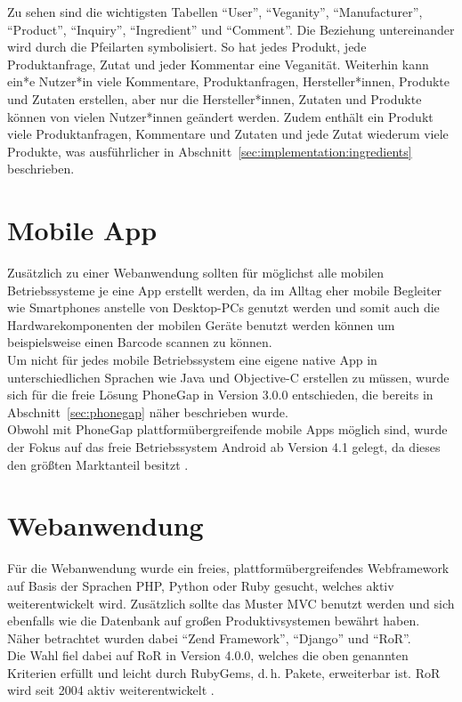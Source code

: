 Zu sehen sind die wichtigsten Tabellen "`User"', "`Veganity"', 
"`Manufacturer"', "`Product"', "`Inquiry"', "`Ingredient"' und "`Comment"'. Die 
Beziehung untereinander wird durch die Pfeilarten symbolisiert.
So hat jedes Produkt, jede Produktanfrage, Zutat und jeder Kommentar eine 
Veganität. Weiterhin kann ein*e Nutzer*in viele Kommentare, Produktanfragen, 
Hersteller*innen, Produkte und Zutaten erstellen, aber nur die 
Hersteller*innen, Zutaten und Produkte können von vielen Nutzer*innen geändert 
werden. Zudem enthält ein Produkt viele Produktanfragen, Kommentare und Zutaten 
und jede Zutat wiederum viele Produkte, was ausführlicher in 
Abschnitt~\ref{sec:implementation:ingredients} beschrieben.

\section{Mobile App}
\label{sec:implementation:app}

Zusätzlich zu einer Webanwendung sollten für möglichst alle mobilen
Betriebssysteme je eine \ac{App} erstellt werden, da im Alltag
eher mobile Begleiter wie Smartphones anstelle von Desktop-PCs genutzt werden
und somit auch die Hardwarekomponenten der mobilen Geräte benutzt werden
können um beispielsweise einen Barcode scannen zu können.\\
Um nicht für jedes mobile Betriebssystem eine eigene native \ac{App} in
unterschiedlichen Sprachen wie Java und Objective-C erstellen zu
müssen, wurde sich für die freie Lösung PhoneGap in Version 3.0.0
entschieden, die bereits in
Abschnitt~\ref{sec:phonegap} näher beschrieben wurde.\\
Obwohl mit PhoneGap plattformübergreifende mobile Apps möglich sind,
wurde der Fokus auf das freie Betriebssystem Android ab Version 4.1
gelegt, da dieses den
größten Marktanteil besitzt .

\section{Webanwendung}
\label{sec:implementation:web}

Für die Webanwendung wurde ein freies, plattformübergreifendes
Webframework auf Basis der
Sprachen PHP, Python oder Ruby gesucht, welches aktiv weiterentwickelt 
wird.
Zusätzlich sollte das
Muster \ac{MVC}
benutzt werden und
sich ebenfalls wie die Datenbank auf großen Produktivsystemen bewährt
haben.\\
Näher betrachtet wurden dabei "`Zend Framework"', "`Django"' und
"`\ac{RoR}"'.\\
Die Wahl fiel dabei auf
\ac{RoR} in Version 4.0.0, welches die oben genannten Kriterien 
erfüllt und
leicht durch RubyGems, d.\,h. Pakete, erweiterbar ist.
\ac{RoR} wird seit 2004 aktiv weiterentwickelt .

